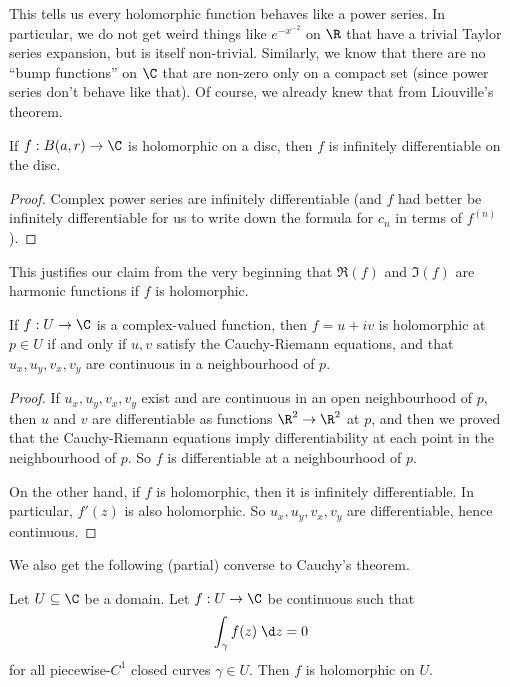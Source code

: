 \documentclass[a4paper]{article}
\begin{document}
This tells us every holomorphic function behaves like a power series. In particular, we do not get weird things like $e^{-x^{-2}}$ on $\R$ that have a trivial Taylor series expansion, but is itself non-trivial. Similarly, we know that there are no ``bump functions'' on $\C$ that are non-zero only on a compact set (since power series don't behave like that). Of course, we already knew that from Liouville's theorem.

\begin{cor}
  If $f: B(a, r) \to \C$ is holomorphic on a disc, then $f$ is infinitely differentiable on the disc.
\end{cor}

\begin{proof}
  Complex power series are infinitely differentiable (and $f$ had better be infinitely differentiable for us to write down the formula for $c_n$ in terms of $f^{(n)}$).
\end{proof}

This justifies our claim from the very beginning that $\Re(f)$ and $\Im(f)$ are harmonic functions if $f$ is holomorphic.

\begin{cor}
  If $f: U\to \C$ is a complex-valued function, then $f = u + iv$ is holomorphic at $p \in U$ if and only if $u, v$ satisfy the Cauchy-Riemann equations, and that $u_x, u_y, v_x, v_y$ are continuous in a neighbourhood of $p$.
\end{cor}

\begin{proof}
  If $u_x, u_y, v_x, v_y$ exist and are continuous in an open neighbourhood of $p$, then $u$ and $v$ are differentiable as functions $\R^2 \to \R^2$ at $p$, and then we proved that the Cauchy-Riemann equations imply differentiability at each point in the neighbourhood of $p$. So $f$ is differentiable at a neighbourhood of $p$.

  On the other hand, if $f$ is holomorphic, then it is infinitely differentiable. In particular, $f'(z)$ is also holomorphic. So $u_x, u_y, v_x, v_y$ are differentiable, hence continuous.
\end{proof}

We also get the following (partial) converse to Cauchy's theorem.
\begin{cor}
  Let $U\subseteq \C$ be a domain. Let $f:U \to \C$ be continuous such that
  \[
    \int_\gamma f(z)\;\d z = 0
  \]
  for all piecewise-$C^1$ closed curves $\gamma \in U$. Then $f$ is holomorphic on $U$.
\end{cor}
\end{document}
